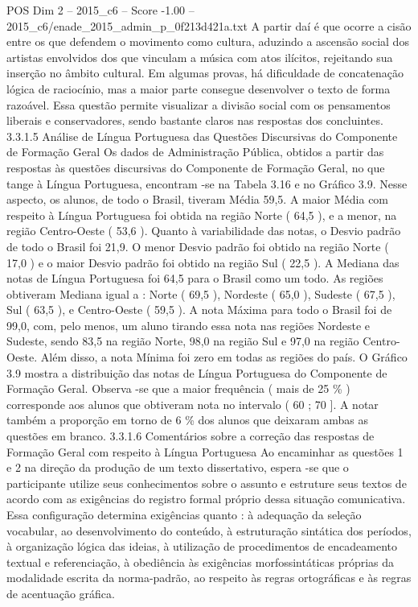 \begin{textsample}{POS Dim 2 – 2015\_c6 – Score -1.00 – 2015\_c6/enade\_2015\_admin\_p\_0f213d421a.txt}
A partir daí é que ocorre a cisão entre os que defendem o movimento como cultura, aduzindo a ascensão social dos artistas envolvidos dos que vinculam a música com atos ilícitos, rejeitando sua inserção no âmbito cultural.
Em algumas provas, há dificuldade de concatenação lógica de raciocínio, mas a maior parte consegue desenvolver o texto de forma razoável.
Essa questão permite visualizar a divisão social com os pensamentos liberais e conservadores, sendo bastante claros nas respostas dos concluintes. 3.3.1.5 Análise de Língua Portuguesa das Questões Discursivas do Componente de Formação Geral Os dados de Administração Pública, obtidos a partir das respostas às questões discursivas do Componente de Formação Geral, no que tange à Língua Portuguesa, encontram -se na Tabela 3.16 e no Gráfico 3.9.
Nesse aspecto, os alunos, de todo o Brasil, tiveram Média 59,5.
A maior Média com respeito à Língua Portuguesa foi obtida na região Norte ( 64,5 ), e a menor, na região Centro-Oeste ( 53,6 ).
Quanto à variabilidade das notas, o Desvio padrão de todo o Brasil foi 21,9.
O menor Desvio padrão foi obtido na região Norte ( 17,0 ) e o maior Desvio padrão foi obtido na região Sul ( 22,5 ).
A Mediana das notas de Língua Portuguesa foi 64,5 para o Brasil como um todo.
As regiões obtiveram Mediana igual a : Norte ( 69,5 ), Nordeste ( 65,0 ), Sudeste ( 67,5 ), Sul ( 63,5 ), e Centro-Oeste ( 59,5 ).
A nota Máxima para todo o Brasil foi de 99,0, com, pelo menos, um aluno tirando essa nota nas regiões Nordeste e Sudeste, sendo 83,5 na região Norte, 98,0 na região Sul e 97,0 na região Centro-Oeste.
Além disso, a nota Mínima foi zero em todas as regiões do país.
O Gráfico 3.9 mostra a distribuição das notas de Língua Portuguesa do Componente de Formação Geral.
Observa -se que a maior frequência ( mais de 25 \% ) corresponde aos alunos que obtiveram nota no intervalo ( 60 ; 70 ].
A notar também a proporção em torno de 6 \% dos alunos que deixaram ambas as questões em branco. 3.3.1.6 Comentários sobre a correção das respostas de Formação Geral com respeito à Língua Portuguesa Ao encaminhar as questões 1 e 2 na direção da produção de um texto dissertativo, espera -se que o participante utilize seus conhecimentos sobre o assunto e estruture seus textos de acordo com as exigências do registro formal próprio dessa situação comunicativa.
Essa configuração determina exigências quanto : à adequação da seleção vocabular, ao desenvolvimento do conteúdo, à estruturação sintática dos períodos, à organização lógica das ideias, à utilização de procedimentos de encadeamento textual e referenciação, à obediência às exigências morfossintáticas próprias da modalidade escrita da norma-padrão, ao respeito às regras ortográficas e às regras de acentuação gráfica.

\end{textsample}
